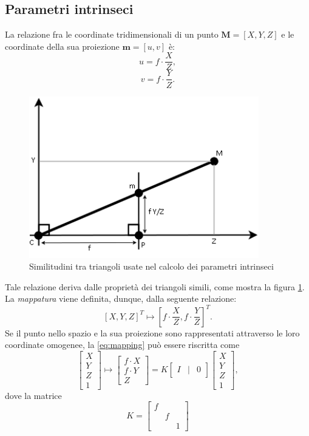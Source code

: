 \subsection{Parametri intrinseci}
\label{intrinsicParam}
La relazione fra le coordinate tridimensionali di un punto $\textbf{M}=[X,Y,Z]$ e le coordinate della sua proiezione $\textbf{m}=[u,v]$ \`e:
\[u=f\cdot \frac{X}{Z},\]
\[v=f\cdot \frac{Y}{Z}.\]
\begin{figure}
	\centering
	\includegraphics[width=10cm]{./pictures/mappatura2d3d}
	\caption{Similitudini tra triangoli usate nel calcolo dei parametri intrinseci}
	\label{fig:mapping}
\end{figure}
\noindent Tale relazione deriva dalle propriet\`a dei triangoli simili, come mostra la figura \ref{fig:mapping}.
La \textit{mappatura} viene definita, dunque, dalla seguente relazione:
\begin{equation}
\label{eq:mapping}
[X,Y,Z]^\textit{T} \mapsto \left[f\cdot \frac{X}{Z}, f\cdot \frac{Y}{Z}\right]^\textit{T}.
\end{equation} 
Se il punto nello spazio e la sua proiezione sono rappresentati attraverso le loro coordinate omogenee, la \eqref{eq:mapping} pu\`o essere riscritta come
\begin{equation}
\label{eq:mappingMatrix}
\left[\begin{array}{c}
X \\ Y \\ Z \\ 1
\end{array}\right] \mapsto 
\left[\begin{array}{c}
f \cdot X \\ f \cdot Y \\ Z
\end{array}\right] = 
K \left[\begin{array}{rcl}
I & | & 0
\end{array}\right]
\left[\begin{array}{c}
X \\ Y \\ Z \\ 1
\end{array}\right],
\end{equation}
dove la matrice
\begin{equation}
\label{eq:kSimple}
K = 
\left[\begin{array}{rccl}
f & & \\
& f & \\
& & 1 
\end{array}\right]
\end{equation}

